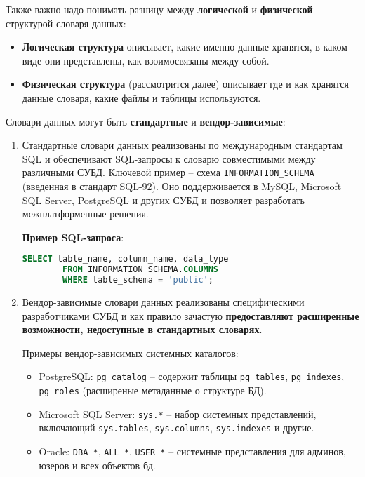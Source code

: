 Также важно надо понимать разницу между \textbf{логической} и \textbf{физической} структурой словаря данных:

\begin{itemize}
    \item \textbf{Логическая структура} описывает, какие именно данные хранятся, в каком виде они представлены, как взоимосвязаны между собой.
    \item \textbf{Физическая структура} (рассмотрится далее) описывает где и как хранятся данные словаря, какие файлы и таблицы используются.
\end{itemize}

Словари данных могут быть \textbf{стандартные} и \textbf{вендор-зависимые}:

\begin{enumerate}
 
    \item Стандартные словари данных реализованы по международным стандартам SQL и обеспечивают SQL-запросы к словарю совместимыми между различными СУБД. Ключевой пример – схема \texttt{INFORMATION\_SCHEMA} (введенная в стандарт SQL-92). Оно поддерживается в MySQL, Microsoft SQL Server, PostgreSQL и других СУБД и позволяет разработать межплатформенные решения.

        \textbf{Пример SQL-запроса}:
        \begin{lstlisting}[language=SQL]
        SELECT table_name, column_name, data_type 
        FROM INFORMATION_SCHEMA.COLUMNS 
        WHERE table_schema = 'public';
        \end{lstlisting}

    \item Вендор-зависимые словари данных реализованы специфическими разработчиками СУБД и как правило зачастую \textbf{предоставляют расширенные возможности, недоступные в стандартных словарях}. 

    Примеры вендор-зависимых системных каталогов:
    \begin{itemize}
        \item PostgreSQL: \texttt{pg\_catalog} – содержит таблицы \texttt{pg\_tables}, \texttt{pg\_indexes}, \texttt{pg\_roles} (расширеные метаданные о структуре БД).
        \item Microsoft SQL Server: \texttt{sys.*} – набор системных представлений, включающий \texttt{sys.tables}, \texttt{sys.columns}, \texttt{sys.indexes} и другие.
        \item Oracle: \texttt{DBA\_*}, \texttt{ALL\_*}, \texttt{USER\_*} – системные представления для админов, юзеров и всех объектов бд.
    \end{itemize}

\end{enumerate}

